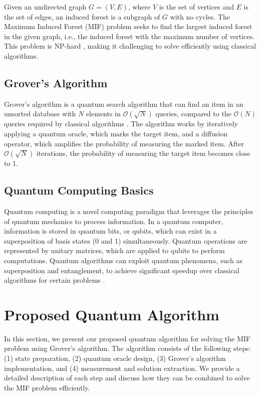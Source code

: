 Given an undirected graph $G = (V, E)$, where $V$ is the set of vertices and $E$ is the set of edges, an induced forest is a subgraph of $G$ with no cycles. The Maximum Induced Forest (MIF) problem seeks to find the largest induced forest in the given graph, i.e., the induced forest with the maximum number of vertices. This problem is NP-hard \cite{np_hard}, making it challenging to solve efficiently using classical algorithms.

\subsection{Grover's Algorithm}

Grover's algorithm is a quantum search algorithm that can find an item in an unsorted database with $N$ elements in $\mathcal{O}(\sqrt{N})$ queries, compared to the $\mathcal{O}(N)$ queries required by classical algorithms \cite{grover}. The algorithm works by iteratively applying a quantum oracle, which marks the target item, and a diffusion operator, which amplifies the probability of measuring the marked item. After $\mathcal{O}(\sqrt{N})$ iterations, the probability of measuring the target item becomes close to 1.

\subsection{Quantum Computing Basics}

Quantum computing is a novel computing paradigm that leverages the principles of quantum mechanics to process information. In a quantum computer, information is stored in quantum bits, or qubits, which can exist in a superposition of basis states (0 and 1) simultaneously. Quantum operations are represented by unitary matrices, which are applied to qubits to perform computations. Quantum algorithms can exploit quantum phenomena, such as superposition and entanglement, to achieve significant speedup over classical algorithms for certain problems \cite{shor, grover}.

\section{Proposed Quantum Algorithm} \label{sec:algorithm}

In this section, we present our proposed quantum algorithm for solving the MIF problem using Grover's algorithm. The algorithm consists of the following steps: (1) state preparation, (2) quantum oracle design, (3) Grover's algorithm implementation, and (4) measurement and solution extraction. We provide a detailed description of each step and discuss how they can be combined to solve the MIF problem efficiently.

